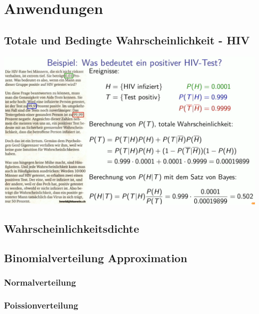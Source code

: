 \section{Anwendungen}
\subsection{Totale und Bedingte Wahrscheinlichkeit - HIV}
\includegraphics[width=\linewidth]{Images/HIV}

\subsection{Wahrscheinlichkeitsdichte}

\subsection{Binomialverteilung Approximation}
\subsubsection{Normalverteilung}\label{approx_normal}

\subsubsection{Poissionverteilung}\label{approx_poission}

